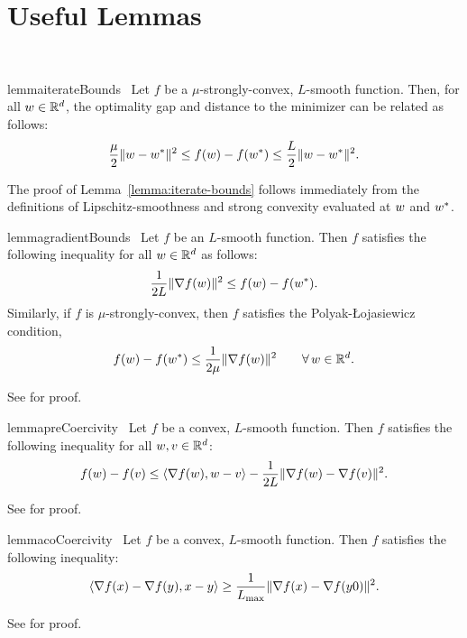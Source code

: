 
\chapter{Useful Lemmas}~\label{app:useful-lemmas}

\begin{restatable}{lemma}{iterateBounds}~\label{lemma:iterate-bounds}
    Let \( f \) be a \( \mu \)-strongly-convex, \( L \)-smooth function. 
    Then, for all \( w \in \mathbb{R}^d \), the optimality gap and distance to the minimizer can be related as follows: 
    \[ \frac{\mu}{2} \|w - w^*\|^2 \leq f(w) - f(w^*) \leq \frac{L}{2} \|w - w^*\|^2. \]
\end{restatable}

The proof of Lemma~\ref{lemma:iterate-bounds} follows immediately from the definitions of Lipschitz-smoothness and strong convexity evaluated at \( w \) and \( w^* \).

\begin{restatable}{lemma}{gradientBounds}~\label{lemma:gradient-bounds}
    Let \( f \) be an \( L \)-smooth function. 
    Then \( f \) satisfies the following inequality for all  \( w \in \mathbb{R}^d \) as follows: 
    \[ \frac{1}{2L} \|\nabla f(w)\|^2 \leq f(w) - f(w^*). \]
    Similarly, if \( f \) is \( \mu \)-strongly-convex, then \( f \) satisfies the Polyak-Łojasiewicz condition, 
    \[ f(w) - f(w^*) \leq \frac{1}{2 \mu}\|\nabla f(w)\|^2 \quad \quad \forall \, w \in \mathbb{R}^d. \]
\end{restatable}
\noindent See \citet{karimi2016linear} for proof.

\begin{restatable}{lemma}{preCoercivity}~\label{lemma:pre-coercivity}
    Let \( f  \) be a convex, \( L  \)-smooth function. 
    Then \( f  \) satisfies the following inequality for all \( w, v \in \mathbb{R}^d \):
    \[ f(w) - f(v)  \leq  \left\langle\nabla f(w), w - v\right\rangle- \frac{1}{2L} \|\nabla f(w) - \nabla f(v)\|^2. \] 
\end{restatable}
\noindent See \citet[Lemma 3.5]{bubeck2015convex} for proof.

\begin{restatable}{lemma}{coCoercivity}~\label{lemma:co-coercivity}
    Let \( f \) be a convex, \( L  \)-smooth function. 
    Then \( f \) satisfies the following inequality:
    \[ \left\langle\nabla f(x) - \nabla f(y), x - y\right\rangle \geq \frac{1}{L_{\text{max}}}\|\nabla f(x) - \nabla f(y0)\|^2. \]
\end{restatable}
\noindent See \citet[Eq. 3.6]{bubeck2015convex} for proof.

